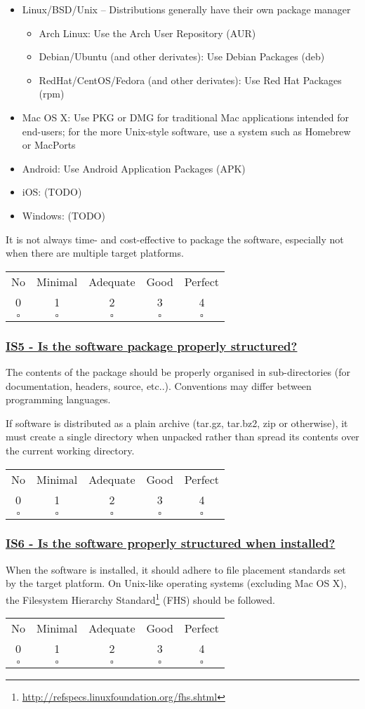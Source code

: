 \documentclass[a4paper,11pt]{article}
\newcommand{\criterion}[2]{\subsubsection*{\underline{#1 - #2}}\label{id:#1}}
\newcommand\CheckTable{%
  \begin{tabular}{ccccc}
    No & Minimal & Adequate & Good & Perfect \\
    0 & 1 & 2 & 3 & 4 \\
    \hline
    $\square$ & $\square$ & $\square$ & $\square$ & $\square$ \\
  \end{tabular}%
}
\begin{document}
\begin{itemize}
    \item Linux/BSD/Unix -- Distributions generally have their own package manager
    \begin{itemize}
        \item Arch Linux: Use the Arch User Repository (AUR)
        \item Debian/Ubuntu (and other derivates): Use Debian Packages (deb)
        \item RedHat/CentOS/Fedora (and other derivates): Use Red Hat Packages (rpm)
    \end{itemize}
    \item Mac OS X: Use PKG or DMG for traditional Mac applications intended for end-users; for the more Unix-style
        software, use a system such as Homebrew or MacPorts
    \item Android: Use Android Application Packages (APK)
    \item iOS: (TODO) 
    \item Windows: (TODO) 
\end{itemize}

It is not always time- and cost-effective to package the software, especially not
when there are multiple target platforms. 

\CheckTable

\newcommand{\isFiveID}{IS5}
\newcommand{\isFiveText}{Is the software package properly structured?}
\criterion{\isFiveID}{\isFiveText}

The contents of the package should be properly organised in sub-directories
(for documentation, headers, source, etc..). Conventions may differ between
programming languages.

If software is distributed as a plain archive (tar.gz, tar.bz2, zip or otherwise),
it must create a single directory when unpacked rather than spread its contents
over the current working directory.

\CheckTable

\newcommand{\isSixID}{IS6}
\newcommand{\isSixText}{Is the software properly structured when installed?}
\criterion{\isSixID}{\isSixText}

When the software is installed, it should adhere to file placement standards set
by the target platform. On Unix-like operating systems (excluding Mac OS X), the Filesystem
Hierarchy Standard\footnote{\url{http://refspecs.linuxfoundation.org/fhs.shtml}} (FHS) should be followed.

\CheckTable
\end{document}
